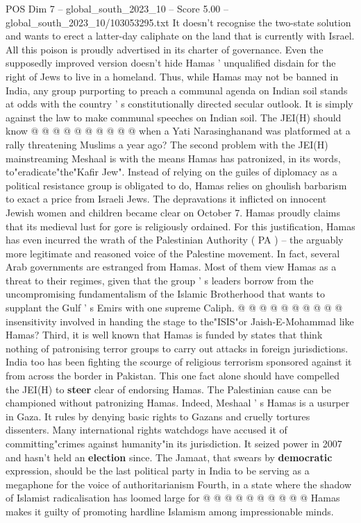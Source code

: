 \begin{textsample}{POS Dim 7 – global\_south\_2023\_10 – Score 5.00 – global\_south\_2023\_10/103053295.txt}
It doesn't recognise the two-state solution and wants to erect a latter-day caliphate on the land that is currently with Israel.
All this poison is proudly advertised in its charter of governance.
Even the supposedly improved version doesn't hide Hamas ' unqualified disdain for the right of Jews to live in a homeland.
Thus, while Hamas may not be banned in India, any group purporting to preach a communal agenda on Indian soil stands at odds with the country ' s constitutionally directed secular outlook.
It is simply against the law to make communal speeches on Indian soil.
The JEI(H) should know @ @ @ @ @ @ @ @ @ @ when a Yati Narasinghanand was platformed at a rally threatening Muslims a year ago?
The second problem with the JEI(H) mainstreaming Meshaal is with the means Hamas has patronized, in its words, to"eradicate"the"Kafir Jew".
Instead of relying on the guiles of diplomacy as a political resistance group is obligated to do, Hamas relies on ghoulish barbarism to exact a price from Israeli Jews.
The depravations it inflicted on innocent Jewish women and children became clear on October 7.
Hamas proudly claims that its medieval lust for gore is religiously ordained.
For this justification, Hamas has even incurred the wrath of the Palestinian Authority ( PA ) -- the arguably more legitimate and reasoned voice of the Palestine movement.
In fact, several Arab governments are estranged from Hamas.
Most of them view Hamas as a threat to their regimes, given that the group ' s leaders borrow from the uncompromising fundamentalism of the Islamic Brotherhood that wants to supplant the Gulf ' s Emirs with one supreme Caliph. @ @ @ @ @ @ @ @ @ @ insensitivity involved in handing the stage to the"ISIS"or Jaish-E-Mohammad like Hamas?
Third, it is well known that Hamas is funded by states that think nothing of patronising terror groups to carry out attacks in foreign jurisdictions.
India too has been fighting the scourge of religious terrorism sponsored against it from across the border in Pakistan.
This one fact alone should have compelled the JEI(H) to \textbf{steer} clear of endorsing Hamas.
The Palestinian cause can be championed without patronizing Hamas.
Indeed, Meshaal ' s Hamas is a usurper in Gaza.
It rules by denying basic rights to Gazans and cruelly tortures dissenters.
Many international rights watchdogs have accused it of committing"crimes against humanity"in its jurisdiction.
It seized power in 2007 and hasn't held an \textbf{election} since.
The Jamaat, that swears by \textbf{democratic} expression, should be the last political party in India to be serving as a megaphone for the voice of authoritarianism Fourth, in a state where the shadow of Islamist radicalisation has loomed large for @ @ @ @ @ @ @ @ @ @ Hamas makes it guilty of promoting hardline Islamism among impressionable minds.

\end{textsample}
